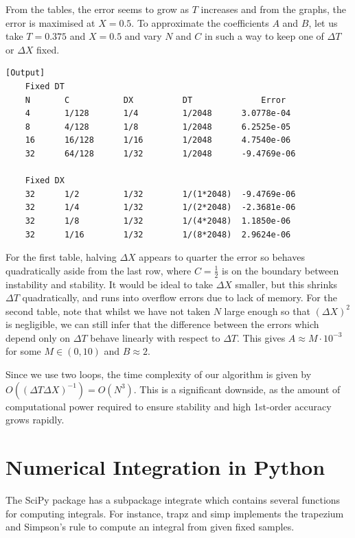 \documentclass{article}
\begin{document}
From the tables, the error seems to grow as \(T\) increases and from the graphs, the error is maximised at \(X = 0.5\). To approximate the coefficients \(A\) and \(B\), let us take \(T = 0.375\) and \(X = 0.5\) and vary \(N\) and \(C\) in such a way to keep one of \(\Delta T\) or \(\Delta X\) fixed.

\begin{verbatim}[Output]
    Fixed DT
    N       C           DX          DT              Error
    4       1/128       1/4         1/2048      3.0778e-04
    8       4/128       1/8         1/2048      6.2525e-05
    16      16/128      1/16        1/2048      4.7540e-06
    32      64/128      1/32        1/2048      -9.4769e-06

    Fixed DX
    32      1/2         1/32        1/(1*2048)  -9.4769e-06
    32      1/4         1/32        1/(2*2048)  -2.3681e-06
    32      1/8         1/32        1/(4*2048)  1.1850e-06
    32      1/16        1/32        1/(8*2048)  2.9624e-06
\end{verbatim}

For the first table, halving \(\Delta X\) appears to quarter the error so behaves quadratically aside from the last row, where \(C = \frac{1}{2}\) is on the boundary between instability and stability. It would be ideal to take \(\Delta X\) smaller, but this shrinks \(\Delta T\) quadratically, and runs into overflow errors due to lack of memory. For the second table, note that whilst we have not taken \(N\) large enough so that \((\Delta X)^2\) is negligible, we can still infer that the difference between the errors which depend only on \(\Delta T\) behave linearly with respect to \(\Delta T\). This gives \(A \approx M \cdot 10^{-3}\) for some \(M \in (0,10)\) and \(B \approx 2 \). 

Since we use two loops, the time complexity of our algorithm is given by \(O((\Delta T \Delta X)^{-1}) = O(N^3)\). This is a significant downside, as the amount of computational power required to ensure stability and high 1st-order accuracy grows rapidly.

\section{Numerical Integration in Python}

The SciPy package has a subpackage integrate which contains several functions for computing integrals. For instance, trapz and simp implements the trapezium and Simpson's rule to compute an integral from given fixed samples.
\end{document}
